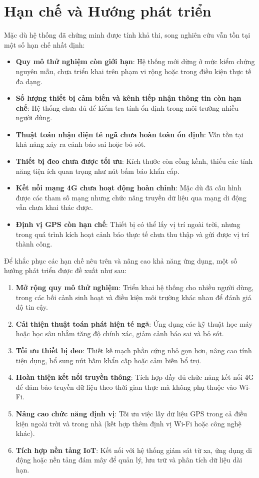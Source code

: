 
\section{Hạn chế và Hướng phát triển}
\label{sec:limitation_future_work}

Mặc dù hệ thống đã chứng minh được tính khả thi, song nghiên cứu vẫn tồn tại một số hạn chế nhất định:

\begin{itemize}
    \item \textbf{Quy mô thử nghiệm còn giới hạn}: Hệ thống mới dừng ở mức kiểm chứng nguyên mẫu, chưa triển khai trên phạm vi rộng hoặc trong điều kiện thực tế đa dạng.
    \item \textbf{Số lượng thiết bị cảm biến và kênh tiếp nhận thông tin còn hạn chế}: Hệ thống chưa đủ để kiểm tra tính ổn định trong môi trường nhiều người dùng.
    \item \textbf{Thuật toán nhận diện té ngã chưa hoàn toàn ổn định}: Vẫn tồn tại khả năng xảy ra cảnh báo sai  hoặc bỏ sót.
    \item \textbf{Thiết bị đeo chưa được tối ưu}: Kích thước còn cồng kềnh, thiếu các tính năng tiện ích quan trọng như nút bấm báo khẩn cấp.
    \item \textbf{Kết nối mạng 4G chưa hoạt động hoàn chỉnh}: Mặc dù đã cấu hình được các tham số mạng nhưng chức năng truyền dữ liệu qua mạng di động vẫn chưa khai thác được.
    \item \textbf{Định vị GPS còn hạn chế}: Thiết bị có thể lấy vị trí ngoài trời, nhưng trong quá trình kích hoạt cảnh báo thực tế chưa thu thập và gửi được vị trí thành công.
\end{itemize}

Để khắc phục các hạn chế nêu trên và nâng cao khả năng ứng dụng, một số hướng phát triển được đề xuất như sau:

\begin{enumerate}
    \item \textbf{Mở rộng quy mô thử nghiệm}: Triển khai hệ thống cho nhiều người dùng, trong các bối cảnh sinh hoạt và điều kiện môi trường khác nhau để đánh giá độ tin cậy.
    \item \textbf{Cải thiện thuật toán phát hiện té ngã}: Ứng dụng các kỹ thuật học máy hoặc học sâu nhằm tăng độ chính xác, giảm cảnh báo sai và bỏ sót.
    \item \textbf{Tối ưu thiết bị đeo}: Thiết kế mạch phần cứng nhỏ gọn hơn, nâng cao tính tiện dụng, bổ sung nút bấm khẩn cấp hoặc cảm biến bổ trợ.
    \item \textbf{Hoàn thiện kết nối truyền thông}: Tích hợp đầy đủ chức năng kết nối 4G để đảm bảo truyền dữ liệu theo thời gian thực mà không phụ thuộc vào Wi-Fi.
    \item \textbf{Nâng cao chức năng định vị}: Tối ưu việc lấy dữ liệu GPS trong cả điều kiện ngoài trời và trong nhà (kết hợp thêm định vị Wi-Fi hoặc công nghệ khác).
    \item \textbf{Tích hợp nền tảng IoT}: Kết nối với hệ thống giám sát từ xa, ứng dụng di động hoặc nền tảng đám mây để quản lý, lưu trữ và phân tích dữ liệu dài hạn.
\end{enumerate}
